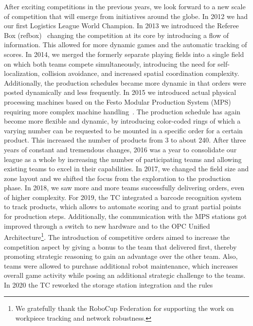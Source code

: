 \documentclass[12pt,twoside]{article}
\begin{document}
 After exciting competitions in the previous years, we look forward to a new
 scale of competition that will emerge from initiatives around the globe. In
 2012 we had our first Logistics League World Champion.  In 2013 we introduced
 the Referee Box (refbox)~\cite{RCI-RefBox} changing the competition at its core
 by introducing a flow of information. This allowed for more dynamic games and
 the automatic tracking of scores.
 In 2014, we merged the formerly separate playing fields into a single field on
 which both teams compete simultaneously, introducing the need for
 self-localization, collision avoidance, and increased spatial coordination
 complexity.  Additionally, the production schedules became more dynamic in that
 orders were posted dynamically and less frequently. In 2015 we introduced
 actual physical processing machines based on the Festo Modular Production
 System (MPS) requiring more complex machine handling~\cite{wdrl2013}. The
 production schedule has again become more flexible and dynamic, by introducing
 color-coded rings of which a varying number can be requested to be mounted in a
 specific order for a certain product.  This increased the number of products
 from 3 to about 240.  After three years of constant and tremendous changes,
 2016 was a year to consolidate our league as a whole by increasing the number
 of participating teams and allowing existing teams to excel in their
 capabilities.  In 2017, we changed the field size and zone layout and we
 shifted the focus from the exploration to the production phase. In 2018, we saw
 more and more teams successfully delivering orders, even of higher complexity.
 For 2019, the TC integrated a barcode recognition system to track
 products, which allows to automate scoring and to grant partial points for
 production steps.  Additionally, the communication with the MPS stations got
 improved through a switch to new hardware and to the OPC Unified
 Architecture\footnote{We gratefully thank the RoboCup Federation for
 supporting the work on workpiece tracking and network robustness.}. The
 introduction of competitive orders aimed to increase the competition aspect by
 giving a bonus to the team that delivered first, thereby promoting strategic
 reasoning to gain an advantage over the other team.  Also, teams were allowed
 to purchase additional robot maintenance, which increases
 overall game activity while posing an additional strategic challenge to the
 teams.
 In 2020 the TC reworked the storage station integration and the rules
\end{document}
